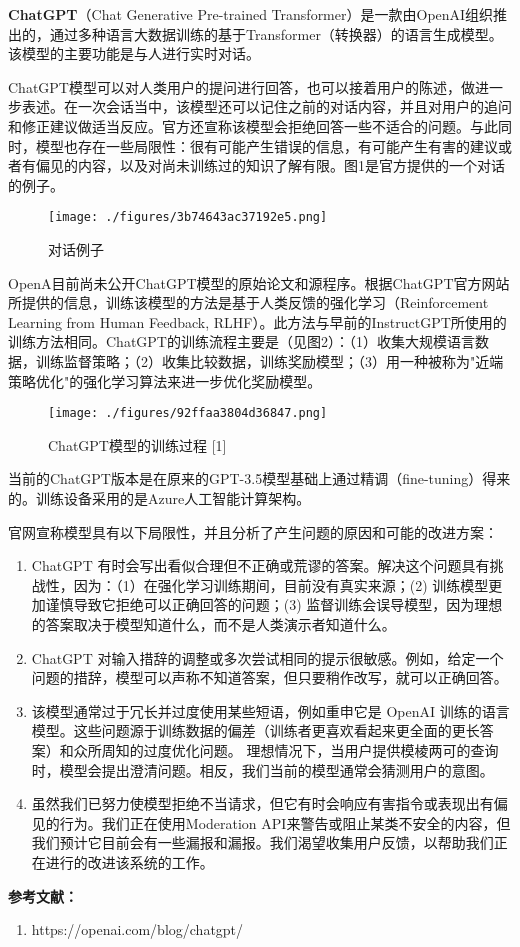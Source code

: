 

\textbf{ChatGPT}（Chat Generative Pre-trained Transformer）是一款由OpenAI组织推出的，通过多种语言大数据训练的基于Transformer（转换器）的语言生成模型。该模型的主要功能是与人进行实时对话。

ChatGPT模型可以对人类用户的提问进行回答，也可以接着用户的陈述，做进一步表述。在一次会话当中，该模型还可以记住之前的对话内容，并且对用户的追问和修正建议做适当反应。官方还宣称该模型会拒绝回答一些不适合的问题。与此同时，模型也存在一些局限性：很有可能产生错误的信息，有可能产生有害的建议或者有偏见的内容，以及对尚未训练过的知识了解有限。图1是官方提供的一个对话的例子。

\begin{figure}[ht]
\centering
\texttt{[image: ./figures/3b74643ac37192e5.png]}
\caption{对话例子} \label{fig_ChGPT_2}
\end{figure}

OpenA目前尚未公开ChatGPT模型的原始论文和源程序。根据ChatGPT官方网站所提供的信息，训练该模型的方法是基于人类反馈的强化学习（Reinforcement Learning from Human Feedback, RLHF）。此方法与早前的InstructGPT所使用的训练方法相同。ChatGPT的训练流程主要是（见图2）：（1）收集大规模语言数据，训练监督策略；（2）收集比较数据，训练奖励模型；（3）用一种被称为"近端策略优化"的强化学习算法来进一步优化奖励模型。
\begin{figure}[ht]
\centering
\texttt{[image: ./figures/92ffaa3804d36847.png]}
\caption{ChatGPT模型的训练过程 [1]} \label{fig_ChGPT_1}
\end{figure}
当前的ChatGPT版本是在原来的GPT-3.5模型基础上通过精调（fine-tuning）得来的。训练设备采用的是Azure人工智能计算架构。

官网宣称模型具有以下局限性，并且分析了产生问题的原因和可能的改进方案：
\begin{enumerate}
\item ChatGPT 有时会写出看似合理但不正确或荒谬的答案。解决这个问题具有挑战性，因为：（1）在强化学习训练期间，目前没有真实来源；(2) 训练模型更加谨慎导致它拒绝可以正确回答的问题；(3) 监督训练会误导模型，因为理想的答案取决于模型知道什么，而不是人类演示者知道什么。
\item ChatGPT 对输入措辞的调整或多次尝试相同的提示很敏感。例如，给定一个问题的措辞，模型可以声称不知道答案，但只要稍作改写，就可以正确回答。
\item 该模型通常过于冗长并过度使用某些短语，例如重申它是 OpenAI 训练的语言模型。这些问题源于训练数据的偏差（训练者更喜欢看起来更全面的更长答案）和众所周知的过度优化问题。
理想情况下，当用户提供模棱两可的查询时，模型会提出澄清问题。相反，我们当前的模型通常会猜测用户的意图。
\item 虽然我们已努力使模型拒绝不当请求，但它有时会响应有害指令或表现出有偏见的行为。我们正在使用Moderation API来警告或阻止某类不安全的内容，但我们预计它目前会有一些漏报和漏报。我们渴望收集用户反馈，以帮助我们正在进行的改进该系统的工作。
\end{enumerate}



\textbf{参考文献：}
\begin{enumerate}
\item https://openai.com/blog/chatgpt/
\end{enumerate}
